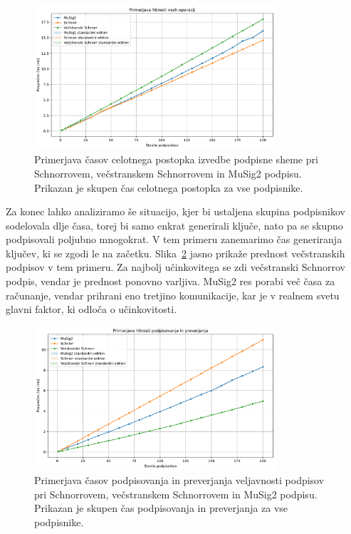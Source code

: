 \begin{figure}[ht]
  \centering
  \includegraphics[width=0.8\textwidth]{images/benchmark_All.pdf}
  \caption[Celotni podpis.]{Primerjava časov celotnega postopka izvedbe podpisne sheme pri Schnorrovem,
      večstranskem Schnorrovem in MuSig2 podpisu. Prikazan je skupen čas celotnega postopka za vse
      podpisnike.}
  \label{fig:celotni}
\end{figure}

Za konec lahko analiziramo še situacijo, kjer bi ustaljena skupina podpisnikov sodelovala dlje časa,
torej bi samo enkrat generirali ključe, nato pa se skupno podpisovali poljubno mnogokrat. V tem
primeru zanemarimo čas generiranja ključev, ki se zgodi le na začetku. Slika~\ref{fig:podpis-preverjanje}
jasno prikaže prednost večstranskih podpisov v tem primeru. Za najbolj učinkovitega se zdi večstranski
Schnorrov podpis, vendar je prednost ponovno varljiva. MuSig2 res porabi več časa za računanje, vendar
prihrani eno tretjino komunikacije, kar je v realnem svetu glavni faktor, ki odloča o učinkovitosti.

\begin{figure}[ht]
  \centering
  \includegraphics[width=0.8\textwidth]{images/benchmark_SigningVerification.pdf}
  \caption[Podpisovanje in preverjanje.]{Primerjava časov podpisovanja in preverjanja veljavnosti
    podpisov pri Schnorrovem, večstranskem Schnorrovem in MuSig2 podpisu. Prikazan je skupen čas
    podpisovanja in preverjanja za vse podpisnike.}
  \label{fig:podpis-preverjanje}
\end{figure}

